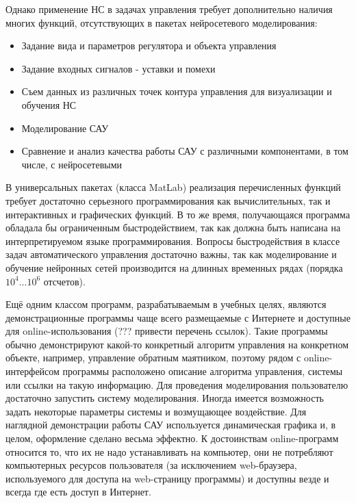 Однако применение НС в задачах управления требует дополнительно
наличия многих функций, отсутствующих в пакетах нейросетевого
моделирования:

\begin{itemize}
\item Задание вида и параметров регулятора и объекта управления
\item Задание входных сигналов - уставки и помехи
\item Съем данных из различных точек контура управления для
  визуализации и обучения НС
\item Моделирование САУ
\item Сравнение и анализ качества работы САУ с различными
  компонентами, в том числе, с нейросетевыми
\end{itemize}

В универсальных пакетах (класса MatLab) реализация перечисленных
функций требует достаточно серьезного программирования как
вычислительных, так и интерактивных и графических функций.  В то же
время, получающаяся программа обладала бы ограниченным
быстродействием, так как должна быть написана на интерпретируемом
языке программирования.  Вопросы быстродействия в классе задач
автоматического управления достаточно важны, так как моделирование и
обучение нейронных сетей производится на длинных временных рядах
(порядка $10^4 ... 10^6$ отсчетов).

Ещё одним классом программ, разрабатываемым в учебных целях, являются
демонстрационные программы чаще всего размещаемые с Интернете и
доступные для online-использования (??? привести перечень ссылок).
Такие программы обычно демонстрируют какой-то конкретный алгоритм
управления на конкретном объекте, например, управление обратным
маятником, поэтому рядом с online-интерфейсом программы расположено
описание алгоритма управления, системы или ссылки на такую информацию.
Для проведения моделирования пользователю достаточно запустить систему
моделирования.  Иногда имеется возможность задать некоторые параметры
системы и возмущающее воздействие.  Для наглядной демонстрации работы
САУ используется динамическая графика и, в целом, оформление сделано
весьма эффектно.  К достоинствам online-программ относится то, что их
не надо устанавливать на компьютер, они не потребляют компьютерных
ресурсов пользователя (за исключением web-браузера, используемого для
доступа на web-страницу программы) и доступны везде и всегда где есть
доступ в Интернет.

